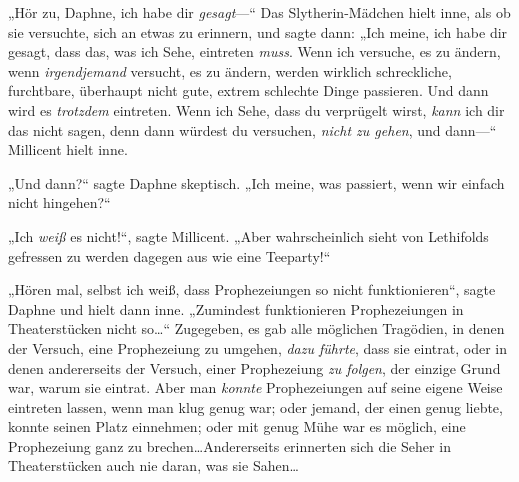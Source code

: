 „Hör zu, Daphne, ich habe dir \emph{gesagt}—“ Das Slytherin-Mädchen hielt inne, als ob sie versuchte, sich an etwas zu erinnern, und sagte dann: „Ich meine, ich habe dir gesagt, dass das, was ich Sehe, eintreten \emph{muss}. Wenn ich versuche, es zu ändern, wenn \emph{irgendjemand} versucht, es zu ändern, werden wirklich schreckliche, furchtbare, überhaupt nicht gute, extrem schlechte Dinge passieren. Und dann wird es \emph{trotzdem} eintreten. Wenn ich Sehe, dass du verprügelt wirst, \emph{kann} ich dir das nicht sagen, denn dann würdest du versuchen, \emph{nicht zu gehen}, und dann—“ Millicent hielt inne.

„Und dann?“ sagte Daphne skeptisch. „Ich meine, was passiert, wenn wir einfach nicht hingehen?“

„Ich \emph{weiß} es nicht!“, sagte Millicent. „Aber wahrscheinlich sieht von Lethifolds gefressen zu werden dagegen aus wie eine Teeparty!“

„Hören mal, selbst ich weiß, dass Prophezeiungen so nicht funktionieren“, sagte Daphne und hielt dann inne. „Zumindest funktionieren Prophezeiungen in Theaterstücken nicht so…“ Zugegeben, es gab alle möglichen Tragödien, in denen der Versuch, eine Prophezeiung zu umgehen, \emph{dazu führte}, dass sie eintrat, oder in denen andererseits der Versuch, einer Prophezeiung \emph{zu folgen}, der einzige Grund war, warum sie eintrat. Aber man \emph{konnte} Prophezeiungen auf seine eigene Weise eintreten lassen, wenn man klug genug war; oder jemand, der einen genug liebte, konnte seinen Platz einnehmen; oder mit genug Mühe war es möglich, eine Prophezeiung ganz zu brechen…Andererseits erinnerten sich die Seher in Theaterstücken auch nie daran, was sie Sahen…

